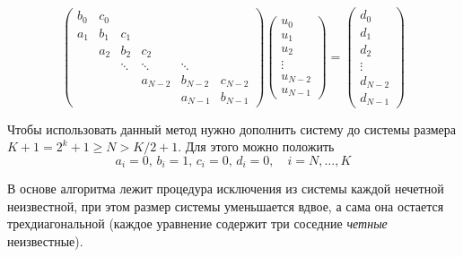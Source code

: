\documentclass[12pt]{article}
\begin{document}
\[
\begin{pmatrix}
b_0 & c_0 \\
a_1 & b_1 & c_1 \\
& a_2 & b_2 & c_2 \\
&& \ddots & \ddots & \ddots\\
&&& a_{N-2} & b_{N-2} & c_{N-2}\\
&&&& a_{N - 1} & b_{N - 1}
\end{pmatrix}
\begin{pmatrix}
u_0\\u_1\\u_2\\\vdots\\u_{N-2}\\u_{N-1}
\end{pmatrix} = 
\begin{pmatrix}
d_0\\d_1\\d_2\\\vdots\\d_{N-2}\\d_{N-1}
\end{pmatrix}
\]

Чтобы использовать данный метод нужно дополнить систему до системы размера
$K + 1 = 2^k + 1 \geq N > K / 2 + 1$. Для этого можно положить 
\[a_i = 0,\, b_i = 1,\, c_i = 0,\, d_i = 0, \quad i = N, \dots, K\]

В основе алгоритма лежит процедура исключения из системы каждой нечетной
неизвестной, при этом размер системы уменьшается вдвое, а сама она остается
трехдиагональной (каждое уравнение содержит три соседние \emph{четные}
неизвестные).
\end{document}
